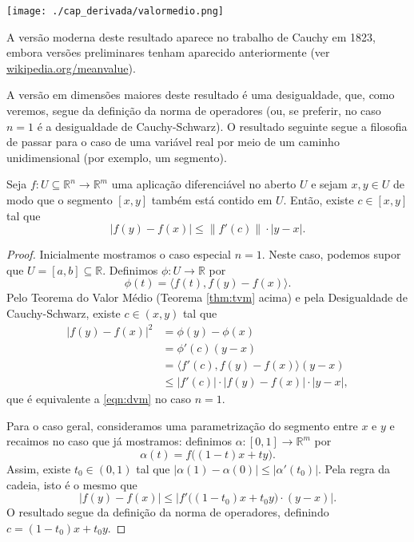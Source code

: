 \begin{center}
	\texttt{[image: ./cap\_derivada/valormedio.png]}
\end{center}


A versão moderna deste resultado aparece no trabalho de Cauchy em 1823, embora versões preliminares tenham aparecido anteriormente (ver \href{https://en.wikipedia.org/w/index.php?title=Mean_value_teorema&oldid=824327691}{wikipedia.org/meanvalue}).


A versão em dimensões maiores deste resultado é uma desigualdade, que, como veremos, segue da definição da norma de operadores (ou, se preferir, no caso $n=1$ é a desigualdade de Cauchy-Schwarz). O resultado seguinte segue a filosofia de passar para o caso de uma variável real por meio de um caminho unidimensional (por exemplo, um segmento).

\begin{teo}\label{thm:dvm}
	Seja $f:U \subseteq \mathbb{R}^n \to \mathbb{R}^m$ uma aplicação diferenciável no aberto $U$ e sejam $x, y \in U$ de modo que o segmento $[x,y]$ também está contido em $U$. Então, existe $c \in [x,y]$ tal que
	\begin{equation}\label{eqn:dvm}
	\big|f(y) - f(x)\big| \le \big\|f'(c)\big\| \cdot |y-x|.
	\end{equation}
\end{teo}

\begin{proof}
	Inicialmente mostramos o caso especial $n=1$. Neste caso, podemos supor que $U = [a,b] \subseteq \mathbb{R}$. Definimos $\phi: U \to \mathbb{R}$ por
	\[
	\phi(t) = \langle f(t), f(y) - f(x) \rangle.
	\] Pelo Teorema do Valor Médio (Teorema \ref{thm:tvm} acima) e pela Desigualdade de Cauchy-Schwarz, existe $c \in (x,y)$ tal que
	\[
	\begin{split}
	\big|f(y) - f(x)\big|^2 & = \phi(y) - \phi(x) \\
	& = \phi'(c) (y-x) \\
	& = \langle f'(c), f(y) - f(x) \rangle (y-x) \\
	& \le \big|f'(c)\big| \cdot \big|f(y) - f(x)\big| \cdot |y-x|,
	\end{split}
	\] que é equivalente a \eqref{eqn:dvm} no caso $n=1$.
	
	Para o caso geral, consideramos uma parametrização do segmento entre $x$ e $y$ e recaimos no caso que já mostramos: definimos $\alpha: [0,1] \to \mathbb{R}^m$ por
	\[
	\alpha(t) = f \big( (1-t)x + ty \big).
	\] Assim, existe $t_0 \in (0,1)$ tal que $|\alpha(1) - \alpha(0)| \le |\alpha'(t_0)|$. Pela regra da cadeia, isto é o mesmo que
	\[
	\big|f(y) - f(x)\big| \le \big| f'\big( (1-t_0)x + t_0 y \big) \cdot (y-x)\big|.
	\] O resultado segue da definição da norma de operadores, definindo $c = (1-t_0)x + t_0 y$.
\end{proof}


